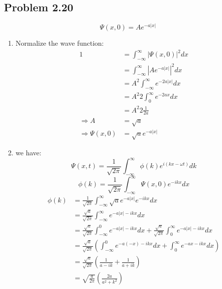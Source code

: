 \documentclass{article}
\begin{document}
\subsection*{Problem 2.20}
\[\Psi(x,0) = A e^{-a|x|}\]
\begin{enumerate}[label=(\alph*)]
	\item Normalize the wave function:
	      \begin{align*}
		      1                     & = \int_{-\infty}^{\infty} |\Psi(x,0)|^2 dx   \\
		                            & = \int_{-\infty}^{\infty} |A e^{-a|x|}|^2 dx \\
		                            & = A^2 \int_{-\infty}^{\infty} e^{-2a|x|} dx  \\
		                            & = A^2 2 \int_{0}^{\infty} e^{-2a x} dx       \\
		                            & = A^2 2 \frac{1}{2a}                         \\
		      \Rightarrow A         & = \sqrt{a}                                   \\
		      \Rightarrow \Psi(x,0) & = \sqrt{a} e^{-a|x|}
	      \end{align*}
	\item we have:
	      \[\Psi(x,t) = \frac{1}{\sqrt{2\pi}} \int_{-\infty}^{\infty} \phi(k) e^{i(kx - \omega t)}dk\]
	      \[\phi(k) = \frac{1}{\sqrt{2 \pi}} \int_{-\infty}^{\infty} \Psi(x,0) e^{-ikx} dx\]
	      \begin{align*}
		      \phi(k) & = \frac{1}{\sqrt{2 \pi}} \int_{-\infty}^{\infty} \sqrt{a} e^{-a|x|} e^{-ikx} dx                                                          \\
		              & = \frac{\sqrt{a}}{\sqrt{2 \pi}} \int_{-\infty}^{\infty} e^{-a|x|-ikx} dx                                                                 \\
		              & = \frac{\sqrt{a}}{\sqrt{2 \pi}} \int_{-\infty}^{0}  e^{-a|x|-ikx} dx + \frac{\sqrt{a}}{\sqrt{2 \pi}} \int_{0}^{\infty}  e^{-a|x|-ikx} dx \\
		              & = \frac{\sqrt{a}}{\sqrt{2 \pi}} \left(\int_{-\infty}^{0} e^{-a(-x)-ikx} dx + \int_{0}^{\infty} e^{-ax-ikx} dx \right)                    \\
		              & = \frac{\sqrt{a}}{\sqrt{2 \pi}} \left(\frac{1}{a - ik} + \frac{1}{a + ik}\right)                                                         \\
		              & = \sqrt{\frac{a}{2\pi}} \left(\frac{2a}{a^2 + k^2 }\right)                                                                               \\

\end{align*}
\end{enumerate}
\end{document}
